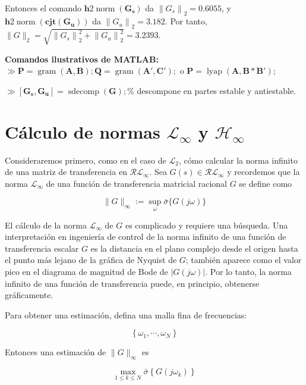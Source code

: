 Entonces el comando $\mathbf{h} 2 \operatorname{norm}\left(\mathbf{G}_{\mathbf{s}}\right)$ da $\left\|G_{s}\right\|_{2}=0.6055$, y $\mathbf{h} 2 \operatorname{norm}\left(\mathbf{cjt}\left(\mathbf{G}_{\mathbf{u}}\right)\right)$ da $\left\|G_{u}\right\|_{2}=3.182$. Por tanto,\\
$\|G\|_{2}=\sqrt{\left\|G_{s}\right\|_{2}^{2}+\left\|G_{u}\right\|_{2}^{2}}=3.2393$.

\textbf{Comandos ilustrativos de MATLAB:}
$\gg \mathbf{P}=\operatorname{gram}(\mathbf{A}, \mathbf{B}) ; \mathbf{Q}=\operatorname{gram}\left(\mathbf{A}', \mathbf{C}'\right) ;$ o $\mathbf{P}=\operatorname{lyap}\left(\mathbf{A}, \mathbf{B} * \mathbf{B}'\right) ;$

$\gg\left[\mathbf{G}_{\mathbf{s}}, \mathbf{G}_{\mathbf{u}}\right]=\operatorname{sdecomp}(\mathbf{G}) ; \%$ descompone en partes estable y antiestable.

\section{Cálculo de normas $\mathcal{L}_{\infty}$ y $\mathcal{H}_{\infty}$}
Consideraremos primero, como en el caso de $\mathcal{L}_{2}$, cómo calcular la norma infinito de una matriz de transferencia en $\mathcal{R} \mathcal{L}_{\infty}$. Sea $G(s) \in \mathcal{R} \mathcal{L}_{\infty}$ y recordemos que la norma $\mathcal{L}_{\infty}$ de una función de transferencia matricial racional $G$ se define como

$$
\|G\|_{\infty}:=\sup _{\omega} \bar{\sigma}\{G(j \omega)\}
$$

El cálculo de la norma $\mathcal{L}_{\infty}$ de $G$ es complicado y requiere una búsqueda. Una interpretación en ingeniería de control de la norma infinito de una función de transferencia escalar $G$ es la distancia en el plano complejo desde el origen hasta el punto más lejano de la gráfica de Nyquist de $G$; también aparece como el valor pico en el diagrama de magnitud de Bode de $|G(j \omega)|$. Por lo tanto, la norma infinito de una función de transferencia puede, en principio, obtenerse gráficamente.

Para obtener una estimación, defina una malla fina de frecuencias:

$$
\left\{\omega_{1}, \cdots, \omega_{N}\right\}
$$

Entonces una estimación de $\|G\|_{\infty}$ es

$$
\max _{1 \leq k \leq N} \bar{\sigma}\left\{G\left(j \omega_{k}\right)\right\}
$$

